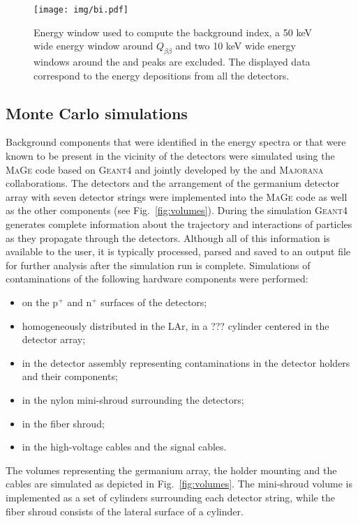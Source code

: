 \begin{figure}
	\centering
	\texttt{[image: img/bi.pdf]}
	\caption{Energy window used to compute the background index, a 50 keV wide energy window around $Q_{\beta\beta}$ and two 10 keV wide energy windows around the  and  peaks are excluded. The displayed data correspond to the energy depositions from all the {\gerda} detectors.}
	\label{fig:bi}
\end{figure}
\subsection*{Monte Carlo simulations}
Background components that were identified in the energy spectra or that were known to be present in the vicinity of the detectors were simulated using the \textsc{MaGe} \cite{MaGe} code based on \textsc{Geant4} \cite{geant4} and jointly developed by the {\gerda} and \textsc{Majorana} \cite{majoranadem} collaborations. The detectors and the arrangement of the germanium detector array with seven detector strings were implemented into the \textsc{MaGe} code as well as the other {\gerda} components (see Fig.~\ref{fig:volumes}). During the simulation \textsc{Geant4} generates complete information about the trajectory and interactions of particles as they propagate through the detectors. Although all of this information is available to the user, it is typically processed, parsed and saved to an output file for further analysis after the simulation run is complete. Simulations of contaminations of the following hardware components were performed:
\begin{itemize}
	\item on the p$^+$ and n$^+$ surfaces of the detectors;
	\item homogeneously distributed in the LAr, in a {\color{red}???} cylinder centered in the detector array;
	\item in the detector assembly representing contaminations in the detector holders and their components;
	\item in the nylon mini-shroud surrounding the detectors;
	\item in the fiber shroud;
	\item in the high-voltage cables and the signal cables.
\end{itemize}
The volumes representing the germanium array, the holder mounting and the cables are simulated as depicted in Fig.~\ref{fig:volumes}. The mini-shroud volume is implemented as a set of cylinders surrounding each detector string, while the fiber shroud consists of the lateral surface of a cylinder.
